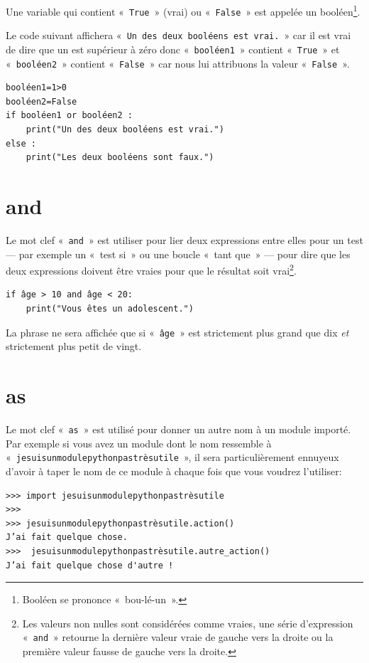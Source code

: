 Une variable qui contient «~\texttt{True}~» (vrai) ou «~\texttt{False}~» est appelée un booléen\footnote{Booléen se prononce «~bou-lé-un~».}.  

Le code suivant affichera «~\texttt{Un des deux booléens est vrai.}~» car il est vrai de dire que un est supérieur à zéro donc «~\texttt{booléen1}~» contient «~\texttt{True}~» et «~\texttt{booléen2}~» contient «~\texttt{False}~» car nous lui attribuons la valeur «~\texttt{False}~».
  
\begin{Verbatim}[frame=single,rulecolor=\color{gray}]
booléen1=1>0
booléen2=False
if booléen1 or booléen2 :
    print("Un des deux booléens est vrai.")
else :
	print("Les deux booléens sont faux.")
\end{Verbatim}

\section*{and}

Le mot clef «~\texttt{and}~» est utiliser pour lier deux expressions entre elles pour un test --- par exemple un «~test si~» ou une boucle «~tant que~» --- pour dire que les deux expressions doivent être vraies pour que le résultat soit vrai\footnote{Les valeurs non nulles sont considérées comme vraies, une série d'expression «~\texttt{and}~» retourne la dernière valeur vraie de gauche vers la droite ou la  première valeur fausse de gauche vers la droite.}.

\begin{Verbatim}[frame=single,rulecolor=\color{gray}]
if âge > 10 and âge < 20:
    print("Vous êtes un adolescent.")
\end{Verbatim}

La phrase ne sera affichée que si «~\texttt{âge}~» est strictement plus grand que dix \emph{et} strictement plus petit de vingt.

\section*{as}

Le mot clef «~\texttt{as}~» est utilisé pour donner un autre nom à un module importé. Par exemple si vous avez un module dont le nom ressemble à «~\texttt{jesuisunmodulepythonpastrèsutile}~», il sera particulièrement ennuyeux d'avoir à taper le nom de ce module à chaque fois que vous voudrez l'utiliser:
\begin{Verbatim}[frame=single,rulecolor=\color{gray}]
>>> import jesuisunmodulepythonpastrèsutile
>>>
>>> jesuisunmodulepythonpastrèsutile.action()
J’ai fait quelque chose.
>>>  jesuisunmodulepythonpastrèsutile.autre_action()
J’ai fait quelque chose d'autre !
\end{Verbatim}

